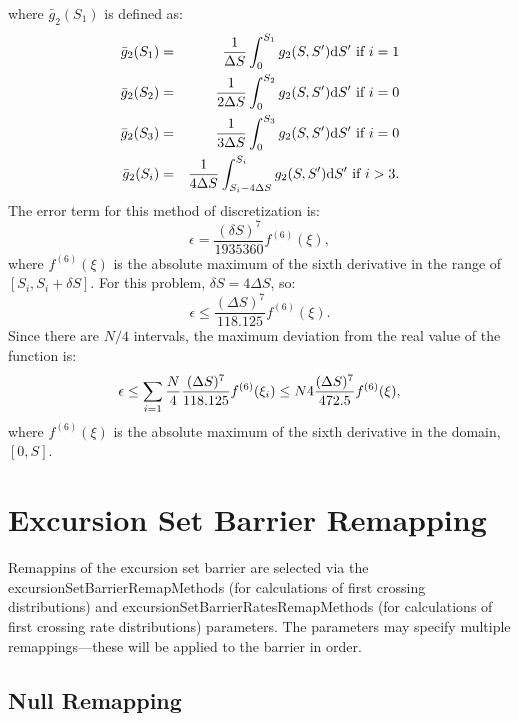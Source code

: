 where $\bar{g}_2(S_1)$ is defined as:
\begin{eqnarray}
      \bar{g}_2(S_1) &=& \frac{1}{\Delta S} \int_{0}^{S_1} g_2(S,S^\prime){\mathrm d}S^\prime     \hbox{ if } i = 1 \\
      \bar{g}_2(S_2) &=& \frac{1}{2 \Delta S} \int_{0}^{S_2} g_2(S,S^\prime){\mathrm d}S^\prime     \hbox{ if } i = 0 \\
      \bar{g}_2(S_3) &=& \frac{1}{3 \Delta S} \int_{0}^{S_3} g_2(S,S^\prime){\mathrm d}S^\prime     \hbox{ if } i = 0 \\
      \bar{g}_2(S_i) &=& \frac{1}{4 \Delta S} \int_{S_i - 4 \Delta S}^{S_i} g_2(S,S^\prime){\mathrm d}S^\prime      \hbox{ if } i > 3.
\end{eqnarray}
The error term for this method of discretization is:
\begin{equation}
  \epsilon = \frac{(\delta S)^7}{1935360} f^{(6)}(\xi),
\end{equation}
where $f^{(6)}(\xi)$ is the absolute maximum of the sixth derivative in the range of $[S_i , S_i + \delta S]$. For this problem, $\delta S = 4 \Delta S$, so:
\begin{equation}
  \epsilon \leq \frac{(\Delta S)^7}{118.125} f^{(6)}(\xi).
\end{equation}
Since there are $N/4$ intervals, the maximum deviation from the real value of the function is:
\begin{equation}
  \epsilon \leq \sum_{i=1}{\frac{N}{4}}\frac{(\Delta S)^7}{118.125} f^{(6)}(\xi _i) \nonumber\\
    \leq  N4\frac{(\Delta S)^7}{472.5} f^{(6)}(\xi),
\end{equation}
where $f^{(6)}(\xi)$ is the absolute maximum of the sixth derivative in the domain, $[0 , S]$.

\section{Excursion Set Barrier Remapping}

Remappins of the excursion set barrier are selected via the {\normalfont \ttfamily excursionSetBarrierRemapMethods} (for calculations of first crossing distributions) and {\normalfont \ttfamily excursionSetBarrierRatesRemapMethods} (for calculations of first crossing rate distributions) parameters. The parameters may specify multiple remappings---these will be applied to the barrier in order.

\subsection{Null Remapping}

